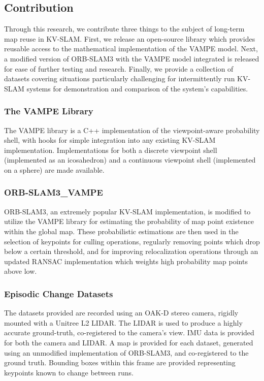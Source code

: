 \subsection{Contribution}

Through this research, we contribute three things to the subject of long-term map reuse in KV-SLAM. First, we release an open-source library which provides reusable access to the mathematical implementation of the VAMPE model. Next, a modified version of ORB-SLAM3 with the VAMPE model integrated is released for ease of further testing and research. Finally, we provide a collection of datasets covering situations particularly challenging for intermittently run KV-SLAM systems for demonstration and comparison of the system's capabilities.

\subsubsection{The VAMPE Library}
The VAMPE library is a C++ implementation of the viewpoint-aware probability shell, with hooks for simple integration into any existing KV-SLAM implementation. Implementations for both a discrete viewpoint shell (implemented as an icosahedron) and a continuous viewpoint shell (implemented on a sphere) are made available.

\subsubsection{ORB-SLAM3\_VAMPE}
ORB-SLAM3, an extremely popular KV-SLAM implementation, is modified to utilize the VAMPE library for estimating the probability of map point existence within the global map. These probabilistic estimations are then used in the selection of keypoints for culling operations, regularly removing points which drop below a certain threshold, and for improving relocalization operations through an updated RANSAC implementation which weights high probability map points above low.

\subsubsection{Episodic Change Datasets}
The datasets provided are recorded using an OAK-D stereo camera, rigidly mounted with a Unitree L2 LIDAR. The LIDAR is used to produce a highly accurate ground-truth, co-registered to the camera's view. IMU data is provided for both the camera and LIDAR. A map is provided for each dataset, generated using an unmodified implementation of ORB-SLAM3, and co-registered to the ground truth. Bounding boxes within this frame are provided representing keypoints known to change between runs.